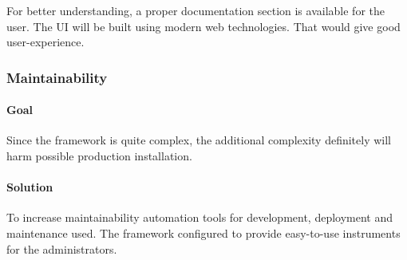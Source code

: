 For better understanding, a proper documentation section is available
for the user. The UI will be built using modern web technologies. That
would give good user-experience.

\hypertarget{maintainability}{%
\subsubsection{Maintainability}\label{maintainability}}

\hypertarget{goal-4}{%
\paragraph{Goal}\label{goal-4}}

Since the framework is quite complex, the additional complexity
definitely will harm possible production installation.

\hypertarget{solution-4}{%
\paragraph{Solution}\label{solution-4}}

To increase maintainability automation tools for development, deployment
and maintenance used. The framework configured to provide easy-to-use
instruments for the administrators.
